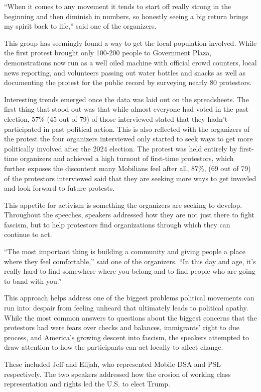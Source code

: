 \documentclass[
]{book}
\begin{document}
``When it comes to any movement it tends to start off really strong in the beginning and then diminish in numbers, so honestly seeing a big return brings my spirit back to life,'' said one of the organizers.

This group has seemingly found a way to get the local population involved. While the first protest brought only 100-200 people to Government Plaza, demonstrations now run as a well oiled machine with official crowd counters, local news reporting, and volunteers passing out water bottles and snacks as well as documenting the protest for the public record by surveying nearly 80 protestors.

Interesting trends emerged once the data was laid out on the spreadsheets. The first thing that stood out was that while almost everyone had voted in the past election, 57\% (45 out of 79) of those interviewed stated that they hadn't participated in past political action. This is also reflected with the organizers of the protest the four organizers interviewed only started to seek ways to get more politically involved after the 2024 election. The protest was held entirely by first-time organizers and achieved a high turnout of first-time protestors, which further exposes the discontent many Mobilians feel after all, 87\%, (69 out of 79) of the protestors interviewed said that they are seeking more ways to get invovled and look forward to future protests.

This appetite for activism is something the organizers are seeking to develop. Throughout the speeches, speakers addressed how they are not just there to fight fascism, but to help protestors find organizations through which they can continue to act.

``The most important thing is building a community and giving people a place where they feel comfortable,'' said one of the organizers. ``In this day and age, it's really hard to find somewhere where you belong and to find people who are going to band with you.''

This approach helps address one of the biggest problems political movements can run into: despair from feeling unheard that ultimately leads to political apathy. While the most common answers to questions about the biggest concerns that the protestors had were fears over checks and balances, immigrants' right to due process, and America's growing descent into fascism, the speakers attempted to draw attention to how the participants can act locally to affect change.

These included Jeff and Elijah, who represented Mobile DSA and PSL respectively. The two speakers addressed how the erosion of working class representation and rights led the U.S. to elect Trump.
\end{document}
